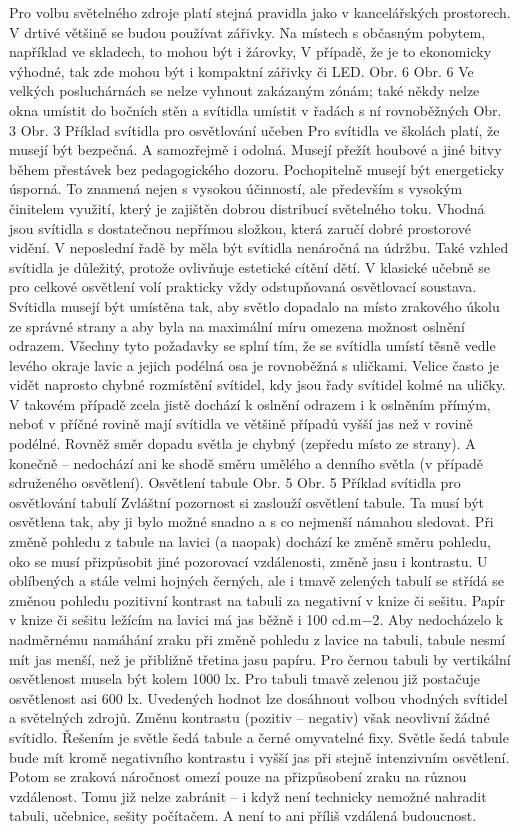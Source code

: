 Pro volbu světelného zdroje platí stejná pravidla jako v kancelářských prostorech. V drtivé většině se budou používat zářivky. Na místech s občasným pobytem, například ve skladech, to mohou být i žárovky, V případě, že je to ekonomicky výhodné, tak zde mohou být i kompaktní zářivky či LED.
Obr. 6
Obr. 6 Ve velkých posluchárnách se nelze vyhnout zakázaným zónám; také někdy nelze okna umístit do bočních stěn a svítidla umístit v řadách s ní rovnoběžných
Obr. 3
Obr. 3 Příklad svítidla pro osvětlování učeben
\medskip
Pro svítidla ve školách platí, že musejí být bezpečná. A samozřejmě i odolná. Musejí přežít houbové a jiné bitvy během přestávek bez pedagogického dozoru. Pochopitelně musejí být energeticky úsporná. To znamená nejen s vysokou účinností, ale především s vysokým činitelem využití, který je zajištěn dobrou distribucí světelného toku. Vhodná jsou svítidla s dostatečnou nepřímou složkou, která zaručí dobré prostorové vidění. V neposlední řadě by měla být svítidla nenáročná na údržbu. Také vzhled svítidla je důležitý, protože ovlivňuje estetické cítění dětí.
\medskip
V klasické učebně se pro celkové osvětlení volí prakticky vždy odstupňovaná osvětlovací soustava. Svítidla musejí být umístěna tak, aby světlo dopadalo na místo zrakového úkolu ze správné strany a aby byla na maximální míru omezena možnost oslnění odrazem. Všechny tyto požadavky se splní tím, že se svítidla umístí těsně vedle levého okraje lavic a jejich podélná osa je rovnoběžná s uličkami. Velice často je vidět naprosto chybné rozmístění svítidel, kdy jsou řady svítidel kolmé na uličky. V takovém případě zcela jistě dochází k oslnění odrazem i k oslněním přímým, neboť v příčné rovině mají svítidla ve většině případů vyšší jas než v rovině podélné. Rovněž směr dopadu světla je chybný (zepředu místo ze strany). A konečně – nedochází ani ke shodě směru umělého a denního světla (v případě sdruženého osvětlení).
Osvětlení tabule
Obr. 5
Obr. 5 Příklad svítidla pro osvětlování tabulí
\medskip
Zvláštní pozornost si zaslouží osvětlení tabule. Ta musí být osvětlena tak, aby ji bylo možné snadno a s co nejmenší námahou sledovat. Při změně pohledu z tabule na lavici (a naopak) dochází ke změně směru pohledu, oko se musí přizpůsobit jiné pozorovací vzdálenosti, změně jasu i kontrastu. U oblíbených a stále velmi hojných černých, ale i tmavě zelených tabulí se střídá se změnou pohledu pozitivní kontrast na tabuli za negativní v knize či sešitu.
\medskip
Papír v knize či sešitu ležícím na lavici má jas běžně i 100 cd.m−2. Aby nedocházelo k nadměrnému namáhání zraku při změně pohledu z lavice na tabuli, tabule nesmí mít jas menší, než je přibližně třetina jasu papíru. Pro černou tabuli by vertikální osvětlenost musela být kolem 1000 lx. Pro tabuli tmavě zelenou již postačuje osvětlenost asi 600 lx. Uvedených hodnot lze dosáhnout volbou vhodných svítidel a světelných zdrojů. Změnu kontrastu (pozitiv – negativ) však neovlivní žádné svítidlo. Řešením je světle šedá tabule a černé omyvatelné fixy. Světle šedá tabule bude mít kromě negativního kontrastu i vyšší jas při stejně intenzivním osvětlení. Potom se zraková náročnost omezí pouze na přizpůsobení zraku na různou vzdálenost. Tomu již nelze zabránit – i když není technicky nemožné nahradit tabuli, učebnice, sešity počítačem. A není to ani příliš vzdálená budoucnost.
